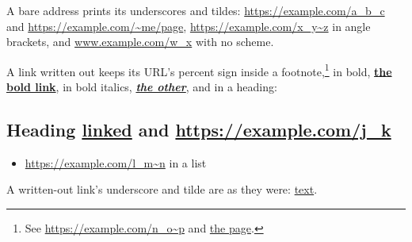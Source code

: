 A bare address prints its underscores and tildes: \href{https://example.com/a_b_c}{https://example.com/a\_b\_c} and
\href{https://example.com/~me/page}{https://example.com/\textasciitilde{}me/page}, \href{https://example.com/x_y~z}{https://example.com/x\_y\textasciitilde{}z} in angle brackets,
and \href{http://www.example.com/w_x}{www.example.com/w\_x} with no scheme.

A link written out keeps its URL's percent sign inside a footnote,\footnote{See \href{https://example.com/n_o~p}{https://example.com/n\_o\textasciitilde{}p} and \href{https://example.com/q\%20r}{the page}.} in bold,
\textbf{\href{https://example.com/u\%20v}{the bold link}}, in bold italics,
\textbf{\emph{\href{https://example.com/w\%20x}{the other}}}, and in a heading:

\subsection{Heading \href{https://example.com/h\%20i}{linked} and \href{https://example.com/j_k}{https://example.com/j\_k}}

\begin{itemize}
\item \href{https://example.com/l_m~n}{https://example.com/l\_m\textasciitilde{}n} in a list
\end{itemize}

A written-out link's underscore and tilde are as they were:
\href{https://example.com/a_b~c}{text}.

